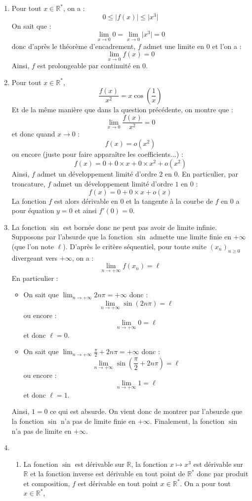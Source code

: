 \documentclass[a4paper,twoside,french,10pt]{VcCours}
\begin{document}
\begin{enumerate}
\item Pour tout $x \in \mathbb{R}^*$, on a :
$$ 0 \leq \vert f(x) \vert \leq \vert x^3 \vert$$
On sait que :
$$\lim_{x \rightarrow 0} 0 = \lim_{x \rightarrow 0} \vert x^3 \vert = 0$$
donc d'après le théorème d'encadrement, $f$ admet une limite en $0$ et l'on a :
$$ \lim_{x \rightarrow 0} f(x) = 0$$
Ainsi, $f$ est prolongeable par continuité en $0$.
\item Pour tout $x \in \mathbb{R}^*$, 
$$ \dfrac{f(x)}{x^2} = x \cos \left( \frac{1}{x} \right) $$
Et de la même manière que dans la question précédente, on montre que :
$$ \lim_{x \rightarrow 0} \dfrac{f(x)}{x^2} = 0$$
et donc quand $x \rightarrow 0$ :
$$ f(x) = o(x^2)$$
ou encore (juste pour faire apparaître les coefficients...) :
$$ f(x) = 0 + 0 \times x + 0 \times x^2+ o(x^2)$$
Ainsi, $f$ admet un développement limité d'ordre $2$ en $0$. En particulier, par troncature, $f$ admet un développement limité d'ordre $1$ en $0$ :
$$ f(x) = 0 + 0 \times x + o(x)$$
La fonction $f$ est alors dérivable en $0$ et la tangente à la courbe de $f$ en $0$ a pour équation $y=0$ et ainsi $f'(0)=0$. 
\item La fonction $\sin$ est bornée donc ne peut pas avoir de limite infinie. Supposons par l'absurde que la fonction $\sin$ admette une limite finie en $+ \infty$ (que l'on note $\ell$). D'après le critère séquentiel, pour toute suite $(x_n)_{n \geq 0}$ divergeant vers $+ \infty$, on a :
$$ \lim_{n \rightarrow + \infty} f(x_n) = \ell$$
En particulier :
\begin{itemize}
\item On sait que $\lim_{n \rightarrow + \infty} 2n \pi = + \infty$ donc :
$$ \lim_{n \rightarrow + \infty} \sin(2n \pi) = \ell$$
ou encore :
$$ \lim_{n \rightarrow + \infty} 0 = \ell$$
et donc $\ell =0$.
\item On sait que $\lim_{n \rightarrow + \infty} \frac{\pi}{2} + 2n \pi = + \infty$ donc :
$$ \lim_{n \rightarrow + \infty} \sin \left( \frac{\pi}{2} + 2n \pi \right) = \ell$$
ou encore :
$$ \lim_{n \rightarrow + \infty} 1 = \ell$$
et donc $\ell =1$.
\end{itemize}
Ainsi, $1=0$ ce qui est absurde. On vient donc de montrer par l'absurde que la fonction $\sin$ n'a pas de limite finie en $+ \infty$. Finalement, la fonction $\sin$ n'a pas de limite en $+ \infty$.
\item 
\begin{enumerate}
\item La fonction $\sin$ est dérivable sur $\mathbb{R}$, la fonction $x \mapsto x^3$ est dérivable sur $\mathbb{R}$ et la fonction inverse est dérivable en tout point de $\mathbb{R}^*$ donc par produit et composition, $f$ est dérivable en tout point $x \in \mathbb{R}^*$. On a pour tout $x \in  \mathbb{R}^*$,

\end{enumerate}
\end{enumerate}
\end{document}
